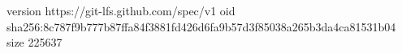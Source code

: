 version https://git-lfs.github.com/spec/v1
oid sha256:8c787f9b777b87ffa84f3881fd426d6fa9b57d3f85038a265b3da4ca81531b04
size 225637
